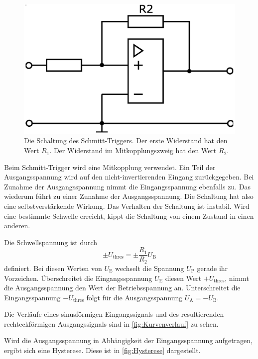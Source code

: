\begin{figure}
    \centering
    \includegraphics[width=0.7\linewidth]{./figures/4_Schmitt.png}
    \caption{Die Schaltung des Schmitt-Triggers. Der erste Widerstand hat den Wert $R_1$. Der Widerstand im Mitkopplungszweig hat den Wert $R_2$. \cite{V51}}
    \label{fig:Schmitt}
\end{figure}

Beim Schmitt-Trigger wird eine Mitkopplung verwendet. Ein Teil der Ausgangsspannung wird auf den nicht-invertierenden Eingang zurückgegeben. Bei Zunahme der Ausgangsspannung nimmt die Eingangsspannung ebenfalls zu. Das wiederum führt zu einer Zunahme der Ausgangsspannung. Die Schaltung hat also eine selbstverstärkende Wirkung.
Das Verhalten der Schaltung ist instabil. Wird eine bestimmte Schwelle erreicht, kippt die Schaltung von einem Zustand in einen anderen.

Die Schwellspannung ist durch 
\begin{equation*}
    \pm U_\text{thres} = \pm \frac{R_1}{R_2} U_\text{B}
    \label{eq:Schwelle}
\end{equation*}
definiert. Bei diesen Werten von $U_\text{E}$ wechselt die Spannung $U_\text{P}$ gerade ihr Vorzeichen.
Überschreitet die Eingangsspannung $U_\text{E}$ diesen Wert $+ U_\text{thres}$, nimmt die Ausgangsspannung den Wert der Betriebsspannung an. Unterschreitet die Eingangsspannung $- U_\text{thres}$ folgt für die Ausgangsspannung $U_\text{A} = - U_\text{B}$.

Die Verläufe eines sinusförmigen Eingangssignals und des resultierenden rechteckförmigen Ausgangssignals sind in \autoref{fig:Kurvenverlauf} zu sehen.

Wird die Ausgangsspannung in Abhängigkeit der Eingangsspannung aufgetragen, ergibt sich eine Hysterese. Diese ist in \autoref{fig:Hysterese} dargestellt. %

